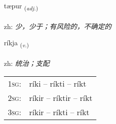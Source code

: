 \documentclass[frontgrid, backgrid]{flacards}\usepackage[]{graphicx}\usepackage[]{color}
\begin{document}
\renewcommand{\flhead}{\vskip5pt \fboxsep=0pt {\small\bfseries\footnotesize Lýsingarorð | 形容词}}
\renewcommand{\fcfoot}{\vskip5pt \fboxsep=0pt \hspace{2pt}{\small\bfseries\footnotesize 2K}}

\renewcommand{\blhead}{\vskip5pt {\small\bfseries\footnotesize Lýsingarorð | 形容词 }}
\renewcommand{\bcfoot}{\vskip5pt \hspace{2pt}{\small\bfseries\footnotesize 2K}}


{tæpur \small{\textsubscript{(\textit{adj.})}} \\[1ex] %
\textphonetic{[tʰaiːpʏr]} \\
zh: \emph{少，少于；有风险的，不确定的} \\  [2ex]
\renewcommand*{\arraystretch}{0.8}
}

\renewcommand{\flhead}{\vskip5pt \fboxsep=0pt {\small\bfseries\footnotesize Sagnorð | 动词}}
\renewcommand{\fcfoot}{\vskip5pt \fboxsep=0pt \hspace{2pt}{\small\bfseries\footnotesize 2K}}

\renewcommand{\blhead}{\vskip5pt {\small\bfseries\footnotesize Sagnorð | 动词 }}
\renewcommand{\bcfoot}{\vskip5pt \hspace{2pt}{\small\bfseries\footnotesize 2K}}


{ríkja \small{\textsubscript{(\textit{v.})}} \\[1ex] %
\textphonetic{[riːca]} \\
zh: \emph{统治；支配} \\  [2ex]
\renewcommand*{\arraystretch}{0.8}
\begin{tabular}{p{1cm}l}
\textsc{1sg}: & ríki -- ríkti -- ríkt \\ 
\textsc{2sg}: & ríkir -- ríktir -- ríkt \\ 
\textsc{3sg}: & ríkir -- ríkti -- ríkt \\ 
\end{tabular}
}
\end{document}
